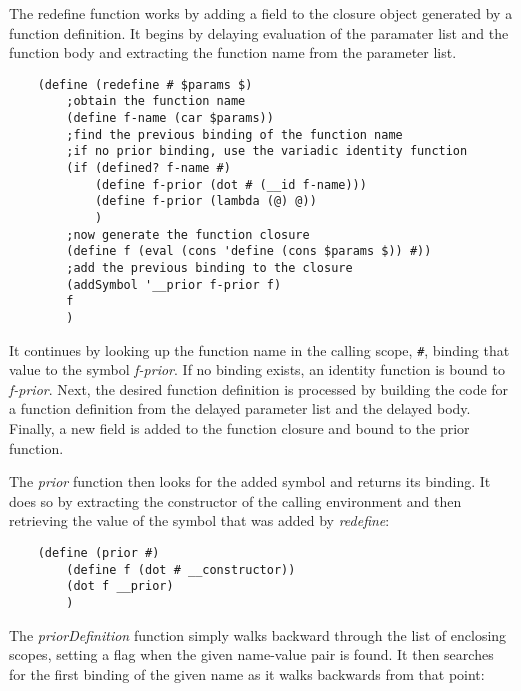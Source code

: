 The redefine function works by adding a field to the closure
object generated by a function definition. It begins by
delaying evaluation of the  paramater list and the function
body and extracting the function name from the parameter list.

\begin{verbatim}
    (define (redefine # $params $)
        ;obtain the function name
        (define f-name (car $params))
        ;find the previous binding of the function name
        ;if no prior binding, use the variadic identity function 
        (if (defined? f-name #)
            (define f-prior (dot # (__id f-name)))
            (define f-prior (lambda (@) @))
            )
        ;now generate the function closure
        (define f (eval (cons 'define (cons $params $)) #))
        ;add the previous binding to the closure
        (addSymbol '__prior f-prior f)
        f
        )
\end{verbatim}

It continues by looking up the function name in the calling scope, \verb!#!,
binding that value to the symbol {\it f-prior}. If no binding exists,
an identity function is bound to {\it f-prior}.
Next, the desired function definition is processed by building
the code for a function definition from the delayed parameter list
and the delayed body.
Finally, a new field is added to the function closure and bound
to the prior function.

The {\it prior} function then looks for the added symbol and returns
its binding. It does so by extracting the constructor of the calling
environment and then retrieving the value of the symbol that was 
added by {\it redefine}:

\begin{verbatim}
    (define (prior #)
        (define f (dot # __constructor))
        (dot f __prior)
        )
\end{verbatim}

The {\it priorDefinition} function simply walks backward through the list of
enclosing scopes, setting a flag when the given name-value pair
is found. It then searches for the first binding of the given
name as it walks backwards from that point:

